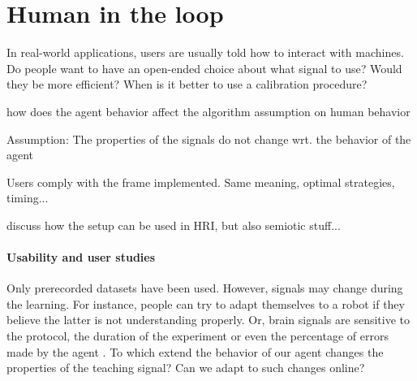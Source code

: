 





\section{Human in the loop}

In real-world applications, users are usually told how to interact with machines. Do people want to have an open-ended choice about what signal to use? Would they be more efficient? When is it better to use a calibration procedure?

how does the agent behavior affect the algorithm assumption on human behavior

Assumption: The properties of the signals do not change wrt. the behavior of the agent

Users comply with the frame implemented. Same meaning, optimal strategies, timing...

discuss how the setup can be used in HRI, but also semiotic stuff...

\paragraph{Usability and user studies}

Only prerecorded datasets have been used. However, signals may change during the learning. For instance, people can try to adapt themselves to a robot if they believe the latter is not understanding properly. Or, brain signals are sensitive to the protocol, the duration of the experiment or even the percentage of errors made by the agent \cite{chavarriaga2010learning}. To which extend the behavior of our agent changes the properties of the teaching signal? Can we adapt to such changes online? 

